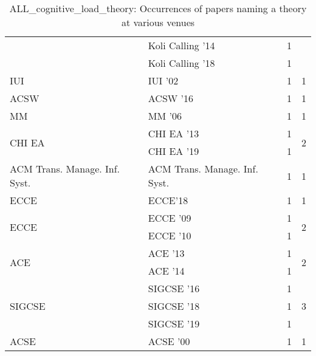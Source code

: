 \begin{table*}[t]
\begin{tabular}{llrr}
& Koli Calling '14 & 1 &\\
& Koli Calling '18 & 1 &\\
\multirow{1}{*}{IUI } & IUI '02 & 1 & \multirow{1}{*}{1}\\
\multirow{1}{*}{ACSW } & ACSW '16 & 1 & \multirow{1}{*}{1}\\
\multirow{1}{*}{MM } & MM '06 & 1 & \multirow{1}{*}{1}\\
\multirow{2}{*}{CHI EA } & CHI EA '13 & 1 & \multirow{2}{*}{2}\\
& CHI EA '19 & 1 &\\
\multirow{1}{*}{ACM Trans. Manage. Inf. Syst.} & ACM Trans. Manage. Inf. Syst. & 1 & \multirow{1}{*}{1}\\
\multirow{1}{*}{ECCE} & ECCE'18 & 1 & \multirow{1}{*}{1}\\
\multirow{2}{*}{ECCE } & ECCE '09 & 1 & \multirow{2}{*}{2}\\
& ECCE '10 & 1 &\\
\multirow{2}{*}{ACE } & ACE '13 & 1 & \multirow{2}{*}{2}\\
& ACE '14 & 1 &\\
\multirow{3}{*}{SIGCSE } & SIGCSE '16 & 1 & \multirow{3}{*}{3}\\
& SIGCSE '18 & 1 &\\
& SIGCSE '19 & 1 &\\
\multirow{1}{*}{ACSE } & ACSE '00 & 1 & \multirow{1}{*}{1}\\
\end{tabular}
\caption{ALL\_cognitive\_load\_theory: Occurrences of papers naming a theory at various venues}
\end{table*}